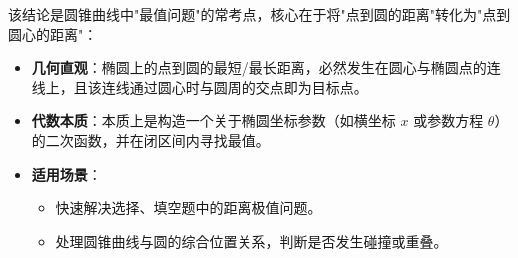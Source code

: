 \begin{explanationbox}
该结论是圆锥曲线中"最值问题"的常考点，核心在于将"点到圆的距离"转化为"点到圆心的距离"：
\begin{itemize}
    \item \textbf{几何直观}：椭圆上的点到圆的最短/最长距离，必然发生在圆心与椭圆点的连线上，且该连线通过圆心时与圆周的交点即为目标点。
    \item \textbf{代数本质}：本质上是构造一个关于椭圆坐标参数（如横坐标 $x$ 或参数方程 $\theta$）的二次函数，并在闭区间内寻找最值。
    \item \textbf{适用场景}：
    \begin{itemize}
        \item 快速解决选择、填空题中的距离极值问题。
        \item 处理圆锥曲线与圆的综合位置关系，判断是否发生碰撞或重叠。
    \end{itemize}
\end{itemize}
\end{explanationbox}